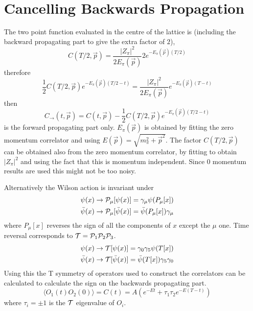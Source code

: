 \documentclass[3p,preprint]{elsarticle}
\begin{document}
\section{Cancelling Backwards Propagation}
The two point function evaluated in the centre of the lattice is (including the
backward propagating part to give the extra factor of $2$),
\begin{equation}
C(T/2, \vec{p}) = \frac{ |Z_\pi|^2 }{ 2 E_\pi(\vec{p}) }   2 e^{- E_\pi(\vec{p}) (T/2) } 
\end{equation}
therefore
\begin{equation}
\frac{1}{2} C(T/2, \vec{p}) e^{ - E_\pi(\vec{p}) (T/2 - t)  } = \frac{ |Z_\pi|^2 }{ 2 E_\pi(\vec{p}) } e^{- E_\pi(\vec{p}) (T - t) }
\end{equation}
then 
\begin{equation}
C_{\rightarrow}(t, \vec{p}) = C(t, \vec{p}) - \frac{1}{2} C(T/2, \vec{p}) e^{ - E_\pi(\vec{p}) (T/2 - t)  }
\end{equation}
is the forward propagating part only. $E_\pi(\vec{p})$ is obtained by fitting the zero momentum correlator
and using $E(\vec{p}) = \sqrt{m_\pi^2 + \vec{p}^2} $. The factor $C(T/2, \vec{p})$ can be obtained also from
the zero momentum correlator, by fitting to obtain $|Z_\pi|^2$ and using the fact that this is momentum independent.
Since $0$ momentum results are used this might not be too noisy.

Alternatively the Wilson action is invariant under
\begin{eqnarray}
	\psi(x) \rightarrow {\cal P_\mu}[ \psi(x) ] = \gamma_\mu \psi( P_\mu[x]) \\
	\bar{ \psi } (x) \rightarrow {\cal P_\mu}[ \bar{ \psi } (x) ] = \bar{ \psi }( P_\mu[x])  \gamma_\mu 
\end{eqnarray}
where $P_\mu[x]$ reverses the sign of all the components of $x$ except the $\mu$ one. Time reversal corresponds to
${\cal T} = {\cal P}_1{\cal P}_2{\cal P}_3$.
\begin{eqnarray}
	\psi(x) \rightarrow {\cal T}[ \psi(x) ] = \gamma_0 \gamma_5 \psi( T[x]) \\
	\bar{ \psi } (x) \rightarrow {\cal T}[ \bar{ \psi } (x) ] = \bar{ \psi }( T[x])  \gamma_5 \gamma_0 
\end{eqnarray}
Using this the T symmetry of operators used to construct the correlators can be calculated to calculate
the sign on the backwards propagating part.
\begin{equation}
\langle O_1(t) O_2(0) \rangle = C(t) = A \left( e^{ -Et} + \tau_1 \tau_2 e^{-E(T - t)}\right)
\end{equation}
where $\tau_i = \pm 1$ is the ${\cal T}$ eigenvalue of $O_i$.
\end{document}
